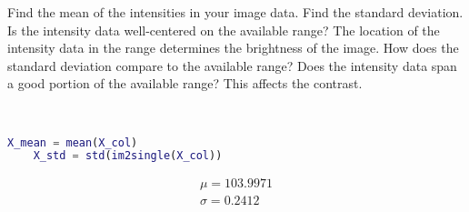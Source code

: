 Find the mean of the intensities in your image data. Find the standard deviation. Is the intensity data well-centered on the available range? The location of the intensity data in the range determines the brightness of the image. How does the standard deviation compare to the available range? Does the intensity data span a good portion of the available range? This affects the contrast.

\begin{solution}\ 
    \begin{lstlisting}[language=Matlab]
    X_mean = mean(X_col)
    X_std = std(im2single(X_col))
    \end{lstlisting}

    \begin{align*}
        \mu = 103.9971 \\
        \sigma = 0.2412
    \end{align*}
\end{solution}
